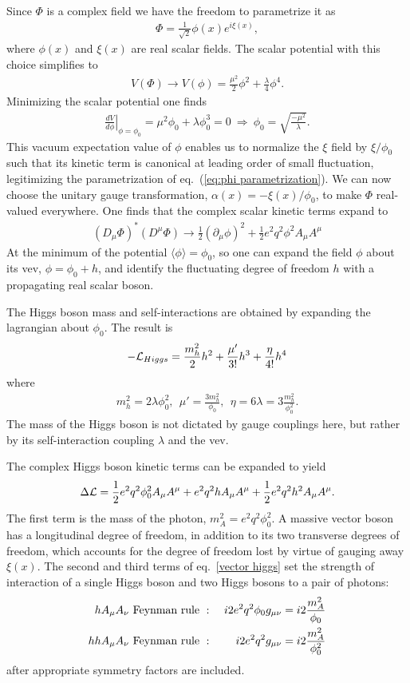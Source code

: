 \documentclass[12pt]{article}
\def\beq{\begin{eqnarray}}
\def\eeq{\end{eqnarray}}
\def\bea{\begin{eqnarray}}
\def\eea{\end{eqnarray}}
\def\eq#1{eq.~(\ref{#1})}
\begin{document}
Since $\Phi$ is a complex field we have the freedom to parametrize it as
\beq
\Phi=\frac{1}{\sqrt{2}}\phi(x) e^{i\xi(x)},
\label{eq:phi parametrization}
\eeq
where $\phi(x)$ and $\xi(x)$ are real scalar fields. The scalar potential with this choice simplifies to
\beq
V(\Phi)\to V(\phi)=\frac{\mu^2}{2}\phi^2+\frac{\lambda}{4}\phi^4.
\eeq
Minimizing the scalar potential one finds
\beq
\left. \frac{dV}{d\phi}\right|_{\phi=\phi_0}=\mu^2\phi_0+\lambda\phi^3_0=0~\Longrightarrow~ 
\phi_0=\sqrt{\frac{-\mu^2}{\lambda}}.
\eeq
This vacuum expectation value of $\phi$ enables us to normalize the $\xi$ field by $\xi/\phi_0$ such that its kinetic term is canonical at leading order of small fluctuation, legitimizing the parametrization of
\eq{eq:phi parametrization}. We can now choose the unitary gauge transformation, $\alpha(x)=-\xi(x)/\phi_0$, to make $\Phi$ real-valued everywhere.
One finds that the complex scalar kinetic terms expand to
\beq
(D_\mu\Phi)^*(D^\mu \Phi)\to \frac{1}{2}(\partial_\mu\phi)^2+\frac{1}{2}e^2q^2\phi^2A_\mu A^\mu
\eeq
At the minimum of the potential $\langle \phi\rangle =\phi_0$, so one can expand the field $\phi$ about its vev, $\phi=\phi_0+h$, and identify the fluctuating degree of freedom $h$ with a propagating real scalar boson. 

The Higgs boson mass and self-interactions are obtained by expanding the lagrangian about $\phi_0$. The result is
\beq
-{\cal L}_{Higgs}=\frac{m_h^2}{2}h^2+\frac{\mu'}{3!}h^3+\frac{\eta}{4!}h^4
\eeq
where
\beq
m^2_h=2\lambda\phi^2_0,~~\mu'=\frac{3m^2_h}{\phi_0},~~\eta=6\lambda=3\frac{m^2_h}{\phi_0^2}.
\eeq
The mass of the Higgs boson is not dictated by gauge couplings here, but rather by its self-interaction coupling $\lambda$ and the vev.

The complex Higgs boson kinetic terms can be expanded to yield
\beq
\Delta {\cal L}=\frac{1}{2}e^2q^2\phi_0^2 A_\mu A^\mu+e^2q^2h A_\mu A^\mu
+\frac{1}{2}e^2q^2h^2A_\mu A^\mu.
\label{vector higgs}
\eeq
The first term is the mass of the photon, $m_A^2=e^2q^2\phi_0^2$. A massive vector boson has a longitudinal degree of freedom, in addition to its two transverse degrees of freedom,  which accounts for the degree of freedom lost by virtue of gauging away $\xi(x)$. The second and third terms of eq.~\ref{vector higgs} set the strength of interaction of a single Higgs boson and two Higgs bosons to a pair of photons:
\bea
hA_\mu A_\nu~{\rm Feynman~rule}~& : & ~ i2e^2q^2\phi_0 g_{\mu\nu} = i2\frac{m_A^2}{\phi_0}\label{hAA}\\
hhA_\mu A_\nu~{\rm Feynman~rule}~& : & ~ i2e^2q^2 g_{\mu\nu}=i2\frac{m_A^2}{\phi_0^2}
\eea
after appropriate symmetry factors are included.  
\end{document}
